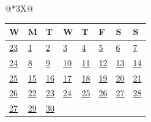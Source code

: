 \begin{tabularx}{\linewidth}{@{}*{3}{X}@{}}
{{\begin{tabularx}{\linewidth}{Y|*{7}{Y}}
  W & M & T & W & T & F & S & S \\ \hline
  \hyperlink{Week 23}{23} &\hyperlink{Week 23}{1}&\hyperlink{Week 23}{2}&\hyperlink{Week 23}{3}&\hyperlink{Week 23}{4}&\hyperlink{Week 23}{5}&\hyperlink{Week 23}{\textcolor{gray!60!black}{6}}&\hyperlink{Week 23}{\textcolor{red!70!black}{7}}\\ 
  \hyperlink{Week 24}{24} &\hyperlink{Week 24}{8}&\hyperlink{Week 24}{9}&\hyperlink{Week 24}{10}&\hyperlink{Week 24}{11}&\hyperlink{Week 24}{12}&\hyperlink{Week 24}{\textcolor{gray!60!black}{13}}&\hyperlink{Week 24}{\textcolor{red!70!black}{14}}\\ 
  \hyperlink{Week 25}{25} &\hyperlink{Week 25}{15}&\hyperlink{Week 25}{16}&\hyperlink{Week 25}{17}&\hyperlink{Week 25}{18}&\hyperlink{Week 25}{19}&\hyperlink{Week 25}{\textcolor{gray!60!black}{20}}&\hyperlink{Week 25}{\textcolor{red!70!black}{21}}\\ 
  \hyperlink{Week 26}{26} &\hyperlink{Week 26}{22}&\hyperlink{Week 26}{23}&\hyperlink{Week 26}{24}&\hyperlink{Week 26}{25}&\hyperlink{Week 26}{26}&\hyperlink{Week 26}{\textcolor{gray!60!black}{27}}&\hyperlink{Week 26}{\textcolor{red!70!black}{28}}\\ 
  \hyperlink{Week 27}{27} &\hyperlink{Week 27}{29}&\hyperlink{Week 27}{30}&&&&&\\ 
  \end{tabularx}}
}
\end{tabularx} \vfill
